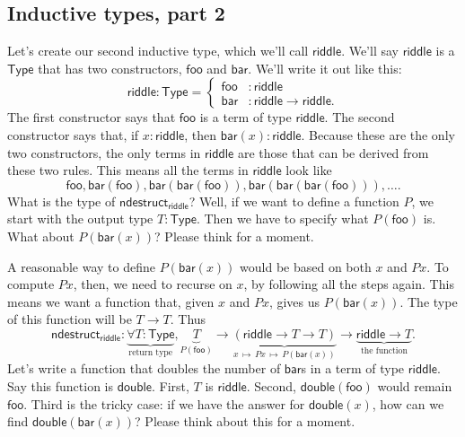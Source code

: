 \documentclass[11pt,paper=letter]{scrartcl}
\renewcommand{\sf}{\mathsf}
\newcommand{\type}{\mathsf{Type}}
\newcommand{\smapsto}{\,\mapsto\,}
\begin{document}
\subsection{Inductive types, part 2}

Let's create our second inductive type, which we'll call $\sf{riddle}$. We'll say $\sf{riddle}$ is a $\type$ that has two constructors, $\sf{foo}$ and $\sf{bar}$. We'll write it out like this: \[
  \sf{riddle} : \type = \begin{cases}
    \sf{foo}&: \sf{riddle} \\
    \sf{bar}&: \sf{riddle} \to \sf{riddle}.
  \end{cases}
\]
The first constructor says that $\sf{foo}$ is a term of type $\sf{riddle}$. The second constructor says that, if $x : \sf{riddle}$, then $\sf{bar}(x) : \sf{riddle}$. Because these are the only two constructors, the only terms in $\sf{riddle}$ are those that can be derived from these two rules. This means all the terms in $\sf{riddle}$ look like \[
  \sf{foo}, \sf{bar}(\sf{foo}), \sf{bar}(\sf{bar}(\sf{foo})), \sf{bar}(\sf{bar}(\sf{bar}(\sf{foo}))), \ldots.
\]
What is the type of $\sf{ndestruct}_\sf{riddle}$? Well, if we want to define a function $P$, we start with the output type $T : \type$. Then we have to specify what $P(\sf{foo})$ is. What about $P(\sf{bar}(x))$? Please think for a moment.

A reasonable way to define $P(\sf{bar}(x))$ would be based on both $x$ and $Px$. To compute $Px$, then, we need to recurse on $x$, by following all the steps again. This means we want a function that, given $x$ and $Px$, gives us $P(\sf{bar}(x))$. The type of this function will be $T \to T$. Thus \[
\sf{ndestruct}_{\sf{riddle}}
:
\underbrace{\forall T: \type}_{\text{return type}},
\underbrace{T}_{P(\sf{foo})} \to
\underbrace{(\sf{riddle} \to T \to T)}_{x\smapsto Px\smapsto P(\sf{bar}(x))} \to
\underbrace{\sf{riddle} \to T}_{\text{the function}}.
\]
Let's write a function that doubles the number of $\sf{bar}$s in a term of type $\sf{riddle}$. Say this function is $\sf{double}$. First, $T$ is $\sf{riddle}$. Second, $\sf{double}(\sf{foo})$ would remain $\sf{foo}$. Third is the tricky case: if we have the answer for $\sf{double}(x)$, how can we find $\sf{double}(\sf{bar}(x))$? Please think about this for a moment.
\end{document}
